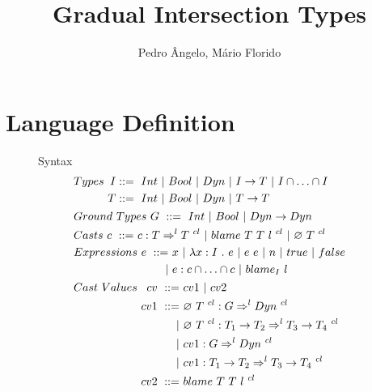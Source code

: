 \documentclass[a4paper]{article}
\begin{document}
\title{Gradual Intersection Types}

\author{Pedro Ângelo, Mário Florido}

\maketitle
{}

\section{Language Definition}
\begin{figure}[H]
Syntax
\begin{align*}
&Types\ \begin{aligned}[t] I &::=\ \Int\ |\ \Bool\ |\ \Dyn\ |\ I \rightarrow T\ |\ I \cap \ldots \cap I\\
                          T &::=\ \Int\ |\ \Bool\ |\ \Dyn\ |\ T \rightarrow T \end{aligned}\\
&Ground\ Types\ G\ ::=\ \Int\ |\ \Bool\ |\ \Dyn \rightarrow \Dyn\\
&Casts\ \begin{aligned}[t] c\ ::=&\ c : T \Rightarrow^l T\ ^{cl}\ |\ \blamecast{T}{T}{l}{cl}\ |\ \emptycast{T}{cl} \end{aligned}\\
&Expressions\ \begin{aligned}[t] e\ ::=&\ x\ |\ \lambda x : I\ .\ e\ |\ e\ e\ |\ n\ |\ \true\ |\ \false\\
                                      |&\ e : c \cap \ldots \cap c\ |\ \blame{I}{l} \end{aligned}\\
&Cast\ Values\ \begin{aligned}[t] cv\ ::=&\ cv1\ |\ cv2\\
                                cv1\ ::=&\ \emptycast{T}{cl} : G \Rightarrow^l \Dyn\ ^{cl}\\
                                       |&\ \emptycast{T}{cl} : T_1 \rightarrow T_2 \Rightarrow^l T_3 \rightarrow T_4\ ^{cl}\\
                                       |&\ cv1 : G \Rightarrow^l \Dyn\ ^{cl}\\
                                       |&\ cv1 : T_1 \rightarrow T_2 \Rightarrow^l T_3 \rightarrow T_4\ ^{cl}\\
                                cv2\ ::=&\ \blamecast{T}{T}{l}{cl}\\

\end{aligned}
\end{align*}
\end{figure}
\end{document}
